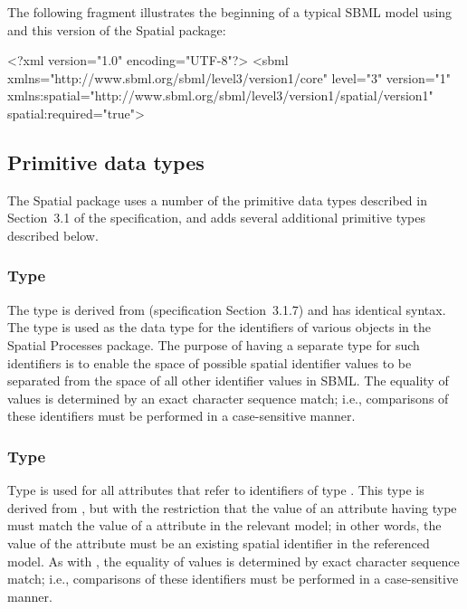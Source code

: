 The following fragment illustrates the beginning of a typical SBML model using \sbmlthreecore and this version of the Spatial package:

\begin{example}
<?xml version="1.0" encoding="UTF-8"?>
<sbml xmlns="http://www.sbml.org/sbml/level3/version1/core" level="3" version="1"
      xmlns:spatial="http://www.sbml.org/sbml/level3/version1/spatial/version1"
      spatial:required="true">
\end{example}


\subsection{Primitive data types}
\label{new-primitive-types}

The Spatial package uses a number of the primitive data types described in Section~3.1 of the \sbmlthreecore specification, and adds several additional primitive types described below.


\subsubsection{Type \fixttspace{}}
\label{primtype-spid}

The type  is derived from 
(\sbmlthreecore specification Section~3.1.7) and has identical syntax. The  type is used as the data type for the identifiers of various objects in the Spatial Processes package.  The purpose of having a separate type for such identifiers is to enable the space of possible spatial identifier values to be separated from the space of all other identifier values in SBML.  The equality of  values is determined by an exact character sequence match; i.e., comparisons of these identifiers must be performed in a case-sensitive manner.


\subsubsection{Type \fixttspace{}}
\label{primtype-spidref}

Type  is used for all attributes that refer to identifiers of type .  This type is derived from , but with the restriction that the value of an attribute having type  must match the value of a  attribute in the relevant model;  in other words, the value of the attribute must be an existing spatial identifier in the referenced model.  As with , the equality of  values is determined by exact character sequence match; i.e., comparisons of these identifiers must be performed in a case-sensitive manner.


